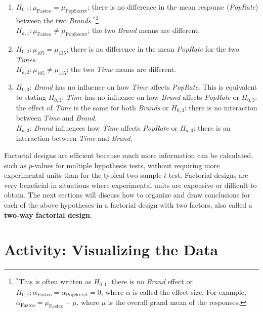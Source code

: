 \documentclass[
]{report}
\begin{document}
\begin{enumerate}
\def\labelenumi{\arabic{enumi}.}
\item
  \(H_{0,1}: \mu_{\text{Fastco}} = \mu_{\text{PopSecret}}\); there is no difference in the mean response (\emph{PopRate}) between the two \emph{Brands}.\(^*\)\footnote{\(^*\)This is often written as \(H_{0,1}\): there is no \emph{Brand} effect or \(H_{0,1}: \alpha_{\text{Fastco}} = \alpha_{\text{PopSecret}} = 0\), where \(\alpha\) is called the effect size. For example, \(\alpha_{\text{Fastco}} = \mu_{\text{Fastco}} - \mu\), where \(\mu\) is the overall grand mean of the responses.}\\
  \(H_{a,1}: \mu_{\text{Fastco}} \ne \mu_{\text{PopSecret}}\); the two \emph{Brand} means are different.
\item
  \(H_{0,2}: \mu_{105} = \mu_{135}\); there is no difference in the mean \emph{PopRate} for the two \emph{Times}.\\
  \(H_{a,2}: \mu_{105} \ne \mu_{135}\); the two \emph{Time} means are different.
\item
  \(H_{0,3}\): \emph{Brand} has no influence on how \emph{Time} affects \emph{PopRate}. This is equivalent to stating \(H_{0,3}\): \emph{Time} has no influence on how \emph{Brand} affects \emph{PopRate} or \(H_{0,3}\): the effect of \emph{Time} is the same for both \emph{Brands} or \(H_{0,3}\): there is no interaction between \emph{Time} and \emph{Brand}.\\
  \(H_{a,3}\): \emph{Brand} influences how \emph{Time} affects \emph{PopRate} or \(H_{a,3}\): there is an interaction between \emph{Time} and \emph{Brand}.
\end{enumerate}

Factorial designs are efficient because much more information can be calculated, such as \(p\)-values for multiple hypothesis tests, without requiring more experimental units than for the typical two-sample \(t\)-test. Factorial designs are very beneficial in situations where experimental units are expensive or difficult to obtain. The next sections will discuss how to organize and draw conclusions for each of the above hypotheses in a factorial design with two factors, also called a \textbf{two-way factorial design}.

\hypertarget{activity-visualizing-the-data}{%
\section*{Activity: Visualizing the Data}\label{activity-visualizing-the-data}}
\end{document}
